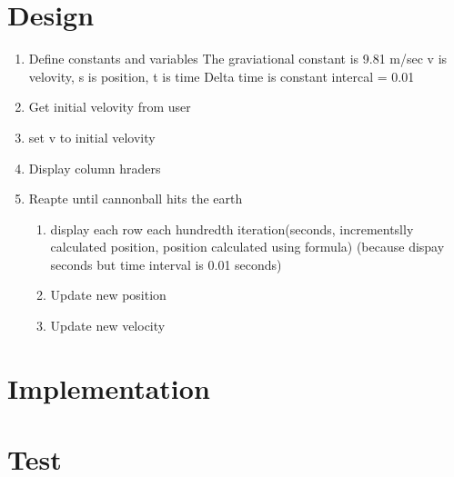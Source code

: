 \documentclass{article}
\begin{document}
\newpage\section*{Design}
\begin{enumerate}
	\item Define constants and variables
	\subitem The graviational constant is 9.81 m/sec
	\subitem v is velovity, s is position, t is time
	\subitem Delta time is constant intercal = 0.01
	\item Get initial velovity from user
	\item set v to initial velovity
	\item Display column hraders
	\item Reapte until cannonball hits the earth
	\begin{enumerate}
		\item display each row each hundredth iteration(seconds, 
		incrementslly calculated position,
		position calculated using formula)
		\subitem (because dispay seconds but time interval is  0.01 seconds)
		\item Update new position
		\item Update new velocity
	\end{enumerate}
	
\end{enumerate}
\newpage\section*{Implementation}



\newpage\section*{Test}
\end{document}
